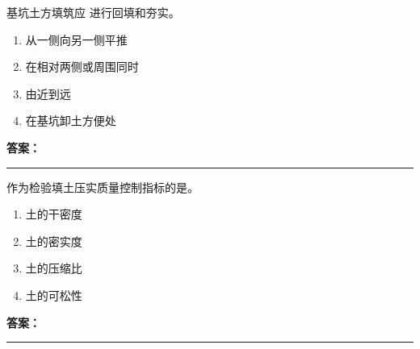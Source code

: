 \documentclass[UTF8,fontset=fandol,11pt]{ctexart}
\newcommand{\answerline}{\textcolor{answerred}{\rule{2.4cm}{0.7pt}}}
\begin{document}
\begin{quizbox}[title={乱序第 150 题｜第一章土方工程}]

基坑土方填筑应 进行回填和夯实。\\

\begin{enumerate}[label=\Alph*.]

\item 从一侧向另一侧平推

\item 在相对两侧或周围同时

\item 由近到远

\item 在基坑卸土方便处

\end{enumerate}

\textbf{\textcolor{answerred}{答案：}} \answerline

\end{quizbox}

\vspace{0.2em}

\begin{quizbox}[title={乱序第 151 题｜第一章土方工程}]

作为检验填土压实质量控制指标的是。\\

\begin{enumerate}[label=\Alph*.]

\item 土的干密度

\item 土的密实度

\item 土的压缩比

\item 土的可松性

\end{enumerate}

\textbf{\textcolor{answerred}{答案：}} \answerline

\end{quizbox}

\vspace{0.2em}
\end{document}
